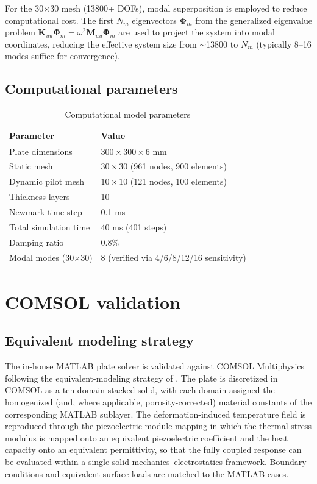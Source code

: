 \documentclass[11pt,a4paper]{article}
\begin{document}
For the 30$\times$30 mesh (13800+ DOFs), modal superposition is employed to reduce computational cost. The first $N_m$ eigenvectors $\bm{\Phi}_m$ from the generalized eigenvalue problem $\bm{K}_{uu}\bm{\Phi}_m = \omega^2\bm{M}_{uu}\bm{\Phi}_m$ are used to project the system into modal coordinates, reducing the effective system size from $\sim$13800 to $N_m$ (typically 8--16 modes suffice for convergence).

\subsection{Computational parameters}

\begin{table}[H]
\centering
\caption{Computational model parameters}
\label{tab:comp-params}
\begin{tabular}{ll}
\toprule
\textbf{Parameter} & \textbf{Value} \\
\midrule
Plate dimensions & $300 \times 300 \times 6$ mm \\
Static mesh & $30 \times 30$ (961 nodes, 900 elements) \\
Dynamic pilot mesh & $10 \times 10$ (121 nodes, 100 elements) \\
Thickness layers & 10 \\
Newmark time step & 0.1 ms \\
Total simulation time & 40 ms (401 steps) \\
Damping ratio & 0.8\% \\
Modal modes (30$\times$30) & 8 (verified via 4/6/8/12/16 sensitivity) \\
\bottomrule
\end{tabular}
\end{table}

\section{COMSOL validation}

\subsection{Equivalent modeling strategy}

The in-house MATLAB plate solver is validated against COMSOL Multiphysics following the equivalent-modeling strategy of \citet{zhang2026}. The plate is discretized in COMSOL as a ten-domain stacked solid, with each domain assigned the homogenized (and, where applicable, porosity-corrected) material constants of the corresponding MATLAB sublayer. The deformation-induced temperature field is reproduced through the piezoelectric-module mapping in which the thermal-stress modulus is mapped onto an equivalent piezoelectric coefficient and the heat capacity onto an equivalent permittivity, so that the fully coupled response can be evaluated within a single solid-mechanics--electrostatics framework. Boundary conditions and equivalent surface loads are matched to the MATLAB cases.
\end{document}
